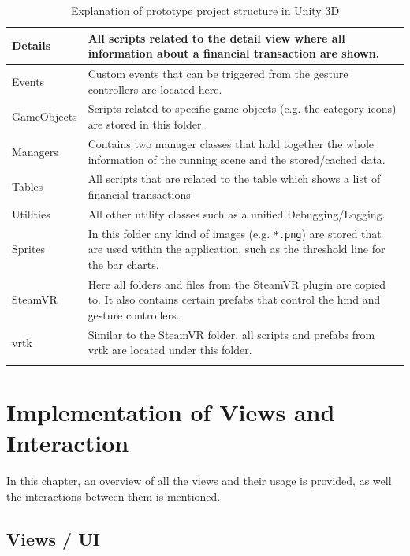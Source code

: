 \begin{longtable}{ | p{3cm} | p{11cm} |}
	\hline
		\textrightarrow{} Details &
		All scripts related to the detail view where all information about a financial transaction are shown. \\
	\hline
		\textrightarrow{} Events &
		Custom events that can be triggered from the gesture controllers are located here. \\
	\hline
		\textrightarrow{} GameObjects &
		Scripts related to specific game objects (e.g. the category icons) are stored in this folder. \\
	\hline
		\textrightarrow{} Managers &
		Contains two manager classes that hold together the whole information of the running scene and the stored/cached data. \\
	\hline
		\textrightarrow{} Tables &
		All scripts that are related to the table which shows a list of financial transactions \\
	\hline
		\textrightarrow{} Utilities &
		All other utility classes such as a unified Debugging/Logging. \\
	\hline
		Sprites &
		In this folder any kind of images (e.g. \texttt{*.png}) are stored that are used within the application, such as the threshold line for the bar charts. \\
	\hline
		SteamVR &
		Here all folders and files from the SteamVR plugin are copied to. It also contains certain prefabs that control the \gls{hmd} and gesture controllers. \\
	\hline
		\gls{vrtk} &
		Similar to the SteamVR folder, all scripts and prefabs from \gls{vrtk} are located under this folder. \\
	\hline
	\caption{Explanation of prototype project structure in Unity 3D}
	\label{tbl:codestructuredesc}
\end{longtable}



\section{Implementation of Views and Interaction}

In this chapter, an overview of all the views and their usage is provided, as well the interactions between them is mentioned.

\subsection{Views / UI}

